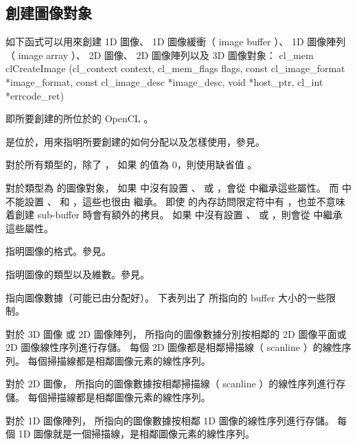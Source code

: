 \subsection{創建圖像對象}
如下函式可以用來創建 1D 圖像、 1D 圖像緩衝（ image buffer ）、 1D 圖像陣列（ image array ）、
2D 圖像、 2D 圖像陣列以及 3D 圖像對象：
\startCLFUNC
cl_mem clCreateImage (cl_context context,
		cl_mem_flags flags,
		const cl_image_format *image_format,
		const cl_image_desc *image_desc,
		void *host_ptr,
		cl_int *errcode_ret)
\stopCLFUNC

 即所要創建的所位於的 OpenCL 。

 是位於，用來指明所要創建的如何分配以及怎樣使用，參見。

對於所有類型的，除了 ，
如果  的值為 0，則使用缺省值 。

對於類型為  的圖像對象，
如果  中沒有設置 、  或 ，會從  中繼承這些屬性。
而  中不能設置 、  和 ，這些也很由  繼承。
即使  的內存訪問限定符中有 ，也並不意味着創建 sub-buffer 時會有額外的拷貝。
如果  中沒有設置 、  或 ，則會從  中繼承這些屬性。

 指明圖像的格式。參見。

 指明圖像的類型以及維數。參見。

 指向圖像數據（可能已由分配好）。
下表列出了  所指向的 buffer 大小的一些限制。



對於 3D 圖像 或 2D 圖像陣列，  所指向的圖像數據分別按相鄰的 2D 圖像平面或 2D 圖像線性序列進行存儲。
每個 2D 圖像都是相鄰掃描線（ scanline ）的線性序列。
每個掃描線都是相鄰圖像元素的線性序列。

對於 2D 圖像，  所指向的圖像數據按相鄰掃描線（ scanline ）的線性序列進行存儲。
每個掃描線都是相鄰圖像元素的線性序列。

對於 1D 圖像陣列，  所指向的圖像數據按相鄰 1D 圖像的線性序列進行存儲。
每個 1D 圖像就是一個掃描線，是相鄰圖像元素的線性序列。

